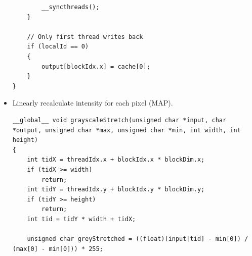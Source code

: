 \documentclass{article}
\begin{document}
\begin{itemize}
\begin{verbatim}
        __syncthreads();
    }

    // Only first thread writes back
    if (localId == 0)
    {
        output[blockIdx.x] = cache[0];
    }
}
    \end{verbatim}
    \item Linearly recalculate intensity for each pixel (MAP).
    \begin{verbatim}
__global__ void grayscaleStretch(unsigned char *input, char *output, unsigned char *max, unsigned char *min, int width, int height)
{
    int tidX = threadIdx.x + blockIdx.x * blockDim.x;
    if (tidX >= width)
        return;
    int tidY = threadIdx.y + blockIdx.y * blockDim.y;
    if (tidY >= height)
        return;
    int tid = tidY * width + tidX;

    unsigned char greyStretched = ((float)(input[tid] - min[0]) / (max[0] - min[0])) * 255;


\end{verbatim}
\end{itemize}
\end{document}
